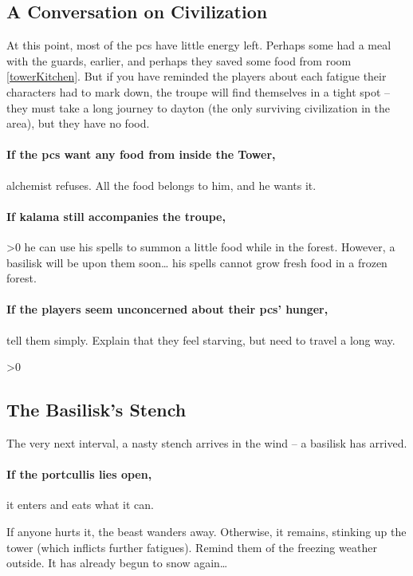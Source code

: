 \begin{multicols}{2}

\subsection{A Conversation on Civilization}

At this point, most of the \glspl{pc} have little energy left.
Perhaps some had a meal with the \glspl{guard}, earlier, and perhaps they saved some food from room \ref{towerKitchen}.
But if you have reminded the players about each \gls{fatigue} their characters had to mark down, the troupe will find themselves in a tight spot -- they must take a long journey to \gls{dayton} (the only surviving civilization in the area), but they have no food.

\paragraph{If the \glspl{pc} want any food from inside the Tower,}
\gls{alchemist} refuses.
All the food belongs to him, and he wants it.

\paragraph{If \gls{kalama} still accompanies the troupe,}
\ifnum\value{temperature}>0
  he can use his spells to summon a little food while in the forest.
  However, a basilisk will be upon them soon\ldots
\else%
  his spells cannot grow fresh food in a frozen forest.
\fi

\paragraph{If the players seem unconcerned about their \glspl{pc}' hunger,}
tell them simply.
Explain that they feel starving, but need to travel a long way.

\ifnum\value{temperature}>0%
  \subsection{The Basilisk's Stench}

  The very next interval, a nasty stench arrives in the wind -- a basilisk has arrived.

  \paragraph{If the portcullis lies open,}
  it enters and eats what it can.

  If anyone hurts it, the beast wanders away.
  Otherwise, it remains, stinking up the tower (which inflicts further \glspl{fatigue}).
  \basilisk
\else
  Remind them of the freezing weather outside.
  It has already begun to snow again\ldots
\fi

\end{multicols}
